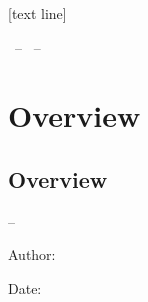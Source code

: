 
\maketitle


[text line]{\parbox{\linewidth}{\vspace*{-10pt}\hspace{0pt}%
	\insertshortauthor\phantom{g\insertpagenumber}%
	\hfill%
	\inserttitle%
	\ifx \insertsubtitle \empty \else \ -- \insertsubtitle\fi%
	\ifx \insertsectionhead \empty \else \ -- \insertsectionhead\fi%
	\hfill%
	\phantom{g\insertshortauthor}\insertpagenumber%
}}


\newcommand{\overview}{
	\section*{Overview}
	\subsection*{Overview}
	\begin{frame}{-- \insertsubtitle}
		\begin{multicols}{3}
			\tableofcontents
		\end{multicols}
	
		\begin{flushright}
			\footnotesize
			Author: \insertauthor
			
			Date: \insertdate
		\end{flushright}
	\end{frame}
}
\overview



\newcommand{\sectionend}{\addtocontents{toc}{\newpage}}
